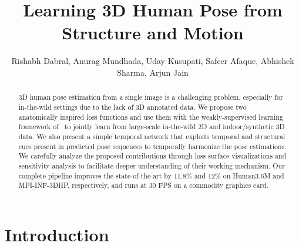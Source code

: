 \documentclass[runningheads]{llncs}
\begin{document}
\pagestyle{headings}
\mainmatter
\def\ECCV18SubNumber{***}  \title{Learning 3D Human Pose from Structure and Motion}

\titlerunning{ }

\authorrunning{ }

\author{Rishabh Dabral, Anurag Mundhada, Uday Kusupati, Safeer Afaque, Abhishek Sharma, Arjun Jain}


\maketitle


\begin{abstract}
3D human pose estimation from a single image is a challenging problem, especially for in-the-wild settings due to the lack of 3D annotated data. We propose two anatomically inspired loss functions and use them with the weakly-supervised learning framework of~\cite{Zhou_2017_ICCV} to jointly learn from large-scale in-the-wild 2D and indoor/synthetic 3D data. We also present a simple temporal network that exploits temporal and structural cues present in predicted pose sequences to temporally harmonize the pose estimations. We carefully analyze the proposed contributions through loss surface visualizations and sensitivity analysis to facilitate deeper understanding of their working mechanism. Our complete pipeline improves the state-of-the-art by 11.8\% and 12\% on Human3.6M and MPI-INF-3DHP, respectively, and runs at 30 FPS on a commodity graphics card. 

\end{abstract}
\vspace{-2em}
\section{Introduction}
\end{document}
